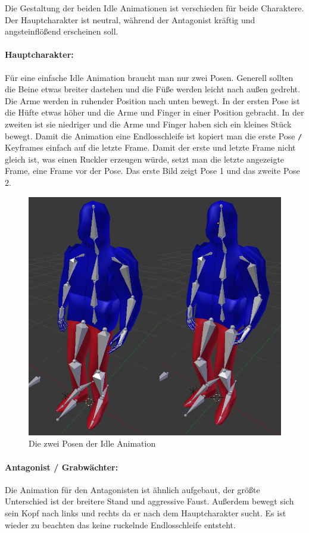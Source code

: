 Die Gestaltung der beiden Idle Animationen ist verschieden für beide Charaktere. Der Hauptcharakter ist neutral, während der Antagonist kräftig und angsteinflößend erscheinen soll.

\paragraph{Hauptcharakter:}
Für eine einfache Idle Animation braucht man nur zwei Posen. Generell sollten die Beine etwas breiter dastehen und die Füße werden leicht nach außen gedreht.
Die Arme werden in ruhender Position nach unten bewegt. In der ersten Pose ist die Hüfte etwas höher und die Arme und Finger in einer Position gebracht.
In der zweiten ist sie niedriger und die Arme und Finger haben sich ein kleines Stück bewegt. Damit die Animation eine Endlosschleife ist kopiert man die erste Pose \verb-/-
Keyframes einfach auf die letzte Frame. Damit der erste und letzte Frame nicht gleich ist,
was einen Ruckler erzeugen würde, setzt man die letzte angezeigte Frame, eine Frame vor der Pose. Das erste Bild zeigt Pose 1 und das zweite Pose 2.

\begin{figure}[H]
    \centering

    \includegraphics[width=.8\textwidth]{images/animation_idle.png}
    \caption{Die zwei Posen der Idle Animation}
\end{figure}

\paragraph{Antagonist / Grabwächter:}
Die Animation für den Antagonisten ist ähnlich aufgebaut, der größte Unterschied ist der breitere Stand und aggressive Faust.
Außerdem bewegt sich sein Kopf nach links und rechts da er nach dem Hauptcharakter sucht. Es ist wieder zu beachten das keine ruckelnde Endlosschleife entsteht.

